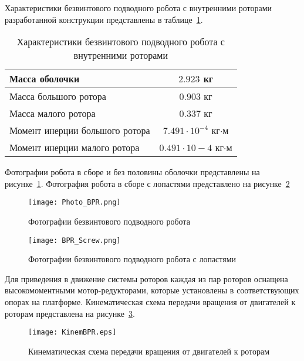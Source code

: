 Характеристики безвинтового подводного робота с внутренними роторами разработанной конструкции представлены в таблице~\ref{tabCharBPR}.

\begin{table}[h]
	\centering
	\caption{Характеристики безвинтового подводного робота с внутренними роторами}\label{tabCharBPR}
	\begin{tabular}{|l|c|}
		\hline
		Масса оболочки	&	$2.923$ кг 	\\ \hline
		Масса большого ротора &	$0.903$ кг	\\ \hline
		Масса малого ротора &	$0.337$ кг \\ \hline
		Момент инерции большого ротора 	& $7.491\cdot10^{-4}$ кг$\cdot$м \\ \hline
		Момент инерции малого ротора &  $0.491\cdot10-4$ кг$\cdot$м\\ \hline
	\end{tabular}
\end{table}

Фотографии робота в сборе и без половины оболочки представлены на рисунке~\ref{Photo_BPR}. Фотография робота в сборе с лопастями представлено на рисунке~\ref{Photo_BPR_Screw}

\begin{figure}[h]
	\centering
	\texttt{[image: Photo\_BPR.png]}%
	\caption{Фотографии безвинтового подводного робота}
	\label{Photo_BPR}
\end{figure}

\begin{figure}[h]
	\centering
	\texttt{[image: BPR\_Screw.png]}%
	\caption{Фотографии безвинтового подводного робота с лопастями}
	\label{Photo_BPR_Screw}
\end{figure}


Для приведения в движение системы роторов каждая из пар роторов оснащена высокомоментными мотор-редукторами, которые установлены в соответствующих опорах на платформе. Кинематическая схема передачи вращения от двигателей к роторам представлена на рисунке~\ref{KinemBPR}.

\begin{figure}[h]
	\centering
	\texttt{[image: KinemBPR.eps]}%
	\caption{Кинематическая схема передачи вращения от двигателей к роторам}
	\label{KinemBPR}
\end{figure}

